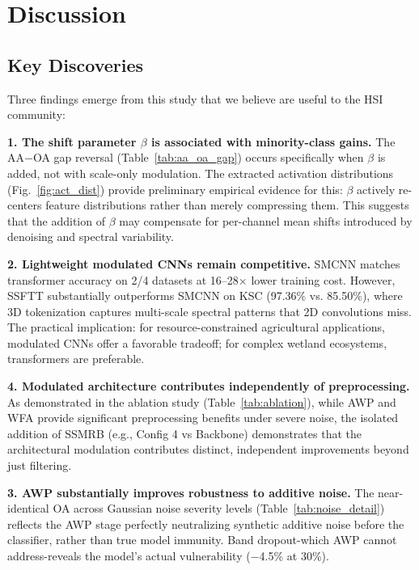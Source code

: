 \documentclass[conference]{IEEEtran}
\begin{document}
\section{Discussion}

\subsection{Key Discoveries}

Three findings emerge from this study that we believe are useful to the HSI community:

\textbf{1. The shift parameter $\beta$ is associated with minority-class gains.} The AA$-$OA gap reversal (Table~\ref{tab:aa_oa_gap}) occurs specifically when $\beta$ is added, not with scale-only modulation. The extracted activation distributions (Fig.~\ref{fig:act_dist}) provide preliminary empirical evidence for this: $\beta$ actively re-centers feature distributions rather than merely compressing them. This suggests that the addition of $\beta$ may compensate for per-channel mean shifts introduced by denoising and spectral variability.

\textbf{2. Lightweight modulated CNNs remain competitive.} SMCNN matches transformer accuracy on 2/4 datasets at 16--28$\times$ lower training cost. However, SSFTT substantially outperforms SMCNN on KSC (97.36\% vs. 85.50\%), where 3D tokenization captures multi-scale spectral patterns that 2D convolutions miss. The practical implication: for resource-constrained agricultural applications, modulated CNNs offer a favorable tradeoff; for complex wetland ecosystems, transformers are preferable.

\textbf{4. Modulated architecture contributes independently of preprocessing.} As demonstrated in the ablation study (Table~\ref{tab:ablation}), while AWP and WFA provide significant preprocessing benefits under severe noise, the isolated addition of SSMRB (e.g., Config 4 vs Backbone) demonstrates that the architectural modulation contributes distinct, independent improvements beyond just filtering.

\textbf{3. AWP substantially improves robustness to additive noise.} The near-identical OA across Gaussian noise severity levels (Table~\ref{tab:noise_detail}) reflects the AWP stage perfectly neutralizing synthetic additive noise before the classifier, rather than true model immunity. Band dropout-which AWP cannot address-reveals the model's actual vulnerability ($-$4.5\% at 30\%).
\end{document}
